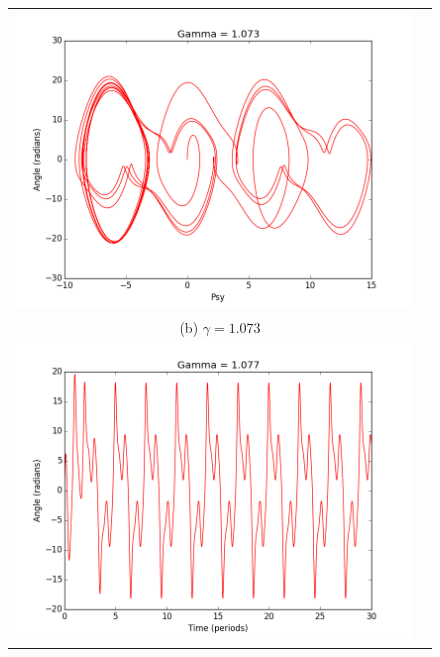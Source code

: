 \documentclass[11pt]{article}
\begin{document}
\begin{figure}[ht]
\begin{tabular}{cc}
\includegraphics[scale=.4]{g073psy.png}\\
\multicolumn{2}{c}{(b) $\gamma = 1.073 $} \\[6pt]

\includegraphics[scale=.4]{g077theta.png}&


\end{tabular}
\end{figure}
\end{document}
